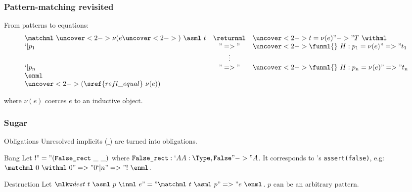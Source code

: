 \begin{frame}
  \frametitle{Pattern-matching revisited}

  From patterns to equations:
  \[ \begin{array}{lcl}
    \matchml~\uncover<2->{\nu{}(}e\uncover<2->{)~\asml~t} & \returnml & \uncover<2->{t = \nu{(e)} "->"} T~\withml \\
    `| p_1 & "=>" & \uncover<2->{\funml{}~H : p_1 = \nu{(e)} "=>"} t_1 \\
    & \vdots{} & \\
    `| p_n & "=>" & \uncover<2->{\funml{}~H : p_n = \nu{(e)} "=>"} t_n \\
    \enml & & \\
    \uncover<2->{(\sref{refl\_equal}~\nu{(e)})} & &
  \end{array}\]

  where $\nu(e)$ coerces $e$ to an inductive object.
  
\end{frame}

\begin{frame}
  \frametitle{Sugar}

  \begin{block}{Obligations}
    Unresolved implicits ($\_$) are turned into obligations.
  \end{block}
  
  \begin{block}{Bang}
    Let $! "=" (\texttt{False\_rect}~\_~\_)$ where $\texttt{False\_rect} : `A
    A : \Type, \texttt{False} "->" A$. It corresponds to \ML's
    \texttt{assert(false)}, e.g: $\matchml~0~\withml~0 "=>" 0 `| n "=>"
    !~\enml$.
  \end{block}
  \pause
  \begin{block}{Destruction}
    Let $\destml~t~\asml~p~\inml~e "=" \matchml~t~\asml~p "=>" e~\enml$.
    $p$ can be an arbitrary pattern.
  \end{block}
  

\end{frame}

